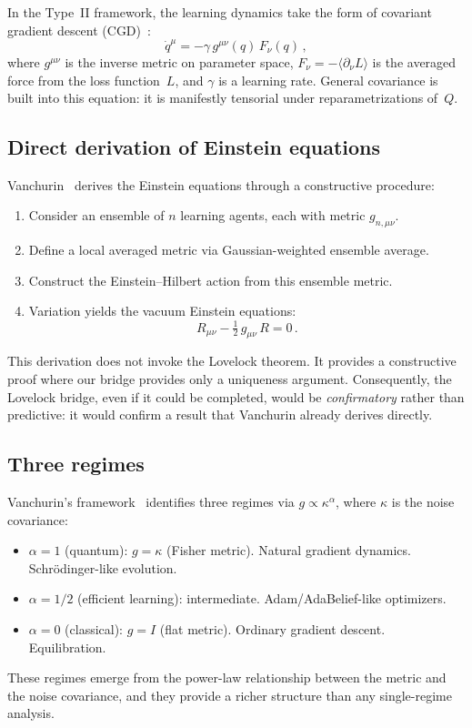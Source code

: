 \documentclass[11pt]{article}
\theoremstyle{definition}
\theoremstyle{remark}
\begin{document}
In the Type~II framework, the learning dynamics take the form of
covariant gradient descent (CGD)~\cite{Vanchurin2025CGD}:
\begin{equation}
\label{eq:CGD}
\dot{q}^\mu = -\gamma\, g^{\mu\nu}(q)\, F_\nu(q)\,,
\end{equation}
where $g^{\mu\nu}$ is the inverse metric on parameter space, $F_\nu =
-\langle \partial_\nu L \rangle$ is the averaged force from the loss
function~$L$, and $\gamma$ is a learning rate.
General covariance is built into this equation: it is manifestly tensorial
under reparametrizations of~$Q$.

\subsection{Direct derivation of Einstein equations}
\label{sec:einstein-derivation}

Vanchurin~\cite{Vanchurin2025} derives the Einstein equations through a
constructive procedure:
\begin{enumerate}
\item Consider an ensemble of $n$ learning agents, each with metric
  $g_{n,\mu\nu}$.
\item Define a local averaged metric via Gaussian-weighted ensemble
  average.
\item Construct the Einstein--Hilbert action from this ensemble metric.
\item Variation yields the vacuum Einstein equations:
  \begin{equation}
  \label{eq:einstein-vacuum}
  R_{\mu\nu} - \tfrac{1}{2}\, g_{\mu\nu}\, R = 0\,.
  \end{equation}
\end{enumerate}
This derivation does not invoke the Lovelock theorem.
It provides a constructive proof where our bridge provides only a
uniqueness argument.
Consequently, the Lovelock bridge, even if it could be completed, would
be \emph{confirmatory} rather than predictive: it would confirm a result
that Vanchurin already derives directly.

\subsection{Three regimes}
\label{sec:three-regimes}

Vanchurin's framework~\cite{Vanchurin2025} identifies three regimes via
$g \propto \kappa^\alpha$, where $\kappa$ is the noise covariance:
\begin{itemize}
\item $\alpha = 1$ (quantum): $g = \kappa$ (Fisher metric). Natural
  gradient dynamics.  Schr\"odinger-like evolution.
\item $\alpha = 1/2$ (efficient learning): intermediate.
  Adam/AdaBelief-like optimizers.
\item $\alpha = 0$ (classical): $g = I$ (flat metric). Ordinary gradient
  descent. Equilibration.
\end{itemize}
These regimes emerge from the power-law relationship between the metric
and the noise covariance, and they provide a richer structure than any
single-regime analysis.
\end{document}
